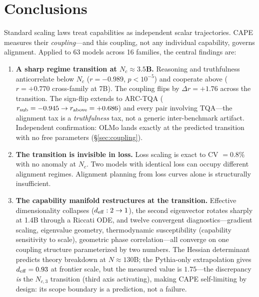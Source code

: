 \documentclass[11pt]{article}
\begin{document}
\section{Conclusions}
\label{sec:conclusions}

Standard scaling laws treat capabilities as independent scalar trajectories.
CAPE measures their \emph{coupling}---and this coupling, not any individual capability, governs alignment.
Applied to 63 models across 16 families, the central findings are:

\begin{enumerate}[leftmargin=1.5em,itemsep=4pt]
  \item \textbf{A sharp regime transition at $N_c \approx 3.5$B.}
    Reasoning and truthfulness anticorrelate below $N_c$ ($r = -0.989$, $p < 10^{-5}$)
    and cooperate above ($r = +0.770$ cross-family at 7B).
    The coupling flips by $\Delta r = +1.76$ across the transition.
    The sign-flip extends to ARC-TQA ($r_{\rm sub} = -0.945 \to r_{\rm above} = +0.686$) and every pair involving TQA---the
    alignment tax is a \emph{truthfulness} tax, not a generic inter-benchmark artifact.
    Independent confirmation: OLMo lands exactly at the predicted transition with no free parameters (\S\ref{sec:coupling}).

  \item \textbf{The transition is invisible in loss.}
    Loss scaling is exact to CV $= 0.8\%$ with no anomaly at $N_c$.
    Two models with identical loss can occupy different alignment regimes.
    Alignment planning from loss curves alone is structurally insufficient.

  \item \textbf{The capability manifold restructures at the transition.}
    Effective dimensionality collapses ($d_{\rm eff}: 2 \to 1$),
    the second eigenvector rotates sharply at 1.4B through a Riccati ODE,
    and twelve convergent diagnostics---gradient scaling, eigenvalue geometry,
    thermodynamic susceptibility (capability sensitivity to scale), geometric phase correlation---all converge
    on one coupling structure parameterized by two numbers.
    The Hessian determinant predicts theory breakdown at $N \approx 130$B; the Pythia-only
    extrapolation gives $d_{\rm eff} = 0.93$ at frontier scale, but the measured value is $1.75$---the
    discrepancy \emph{is} the $N_{c,3}$ transition (third axis activating), making
    CAPE self-limiting by design: its scope boundary is a prediction, not a failure.


\end{enumerate}
\end{document}
